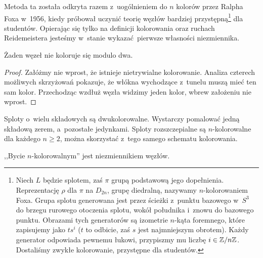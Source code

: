 Metoda ta została odkryta razem z~uogólnieniem do $n$ kolorów przez Ralpha Foxa w~1956, kiedy próbował uczynić teorię węzłów bardziej przystępną\footnote{
    Niech $L$ będzie splotem, zaś $\pi$ grupą podstawową jego dopełnienia.
    Reprezentację $\rho$ dla $\pi$ na $D_{2n}$, grupę diedralną, nazywamy $n$-kolorowaniem Foxa.
    Grupa splotu generowana jest przez ścieżki z~punktu bazowego w~$S^3$ do brzegu rurowego otoczenia splotu, wokół południka i~znowu do bazowego punktu.
    Obrazami tych generatorów są izometrie $n$-kąta foremnego, które zapisujemy jako $ts^i$ ($t$ to odbicie, zaś $s$ jest najmniejszym obrotem).
    Każdy generator odpowiada pewnemu łukowi, przypiszmy mu liczbę $i \in \mathbb Z/n\mathbb Z$.
    Dostaliśmy zwykłe kolorowanie, przystępne dla studentów.
}
dla studentów.
Opierając się tylko na definicji kolorowania oraz ruchach Reidemeistera jesteśmy w~stanie wykazać pierwsze własności niezmiennika.

\begin{proposition}
    Żaden węzeł nie koloruje się modulo dwa.
\end{proposition}

\begin{proof}
    Załóżmy nie wprost, że istnieje nietrywialne kolorowanie.
    Analiza czterech możliwych skrzyżowań pokazuje,
    że włókna wychodzące z~tunelu muszą mieć ten sam kolor.
    Przechodząc wzdłuż węzła widzimy jeden kolor, wbrew założeniu nie wprost.
\end{proof}

Sploty o~wielu składowych są dwukolorowalne.
Wystarczy pomalować jedną składową zerem, a~pozostałe jedynkami.
Sploty rozszczepialne są $n$-kolorowalne dla każdego $n \ge 2$, można skorzystać z~tego samego schematu kolorowania.

\begin{proposition} \label{color_invariant}
    ,,Bycie $n$-kolorowalnym'' jest niezmiennikiem węzłów.
\end{proposition}

